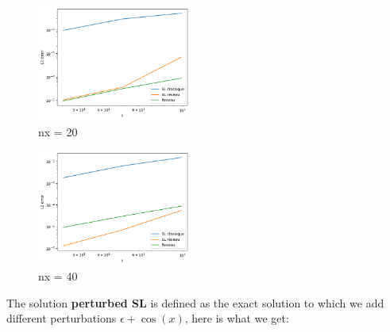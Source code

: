 \documentclass{article}
\begin{document}
\begin{figure}[!h]
    \centering
    \includegraphics[width=0.45\textwidth]{images/i120.png}
    \caption{nx = 20}
\end{figure}

\begin{figure}[!h]
    \centering
    \includegraphics[width=0.45\textwidth]{images/i1.png}
    \caption{nx = 40}
\end{figure}

\newpage

The solution \textbf{perturbed SL} is defined as the exact solution to which we add different perturbations $\epsilon + \cos(x)$, here is what we get:\\
\end{document}
